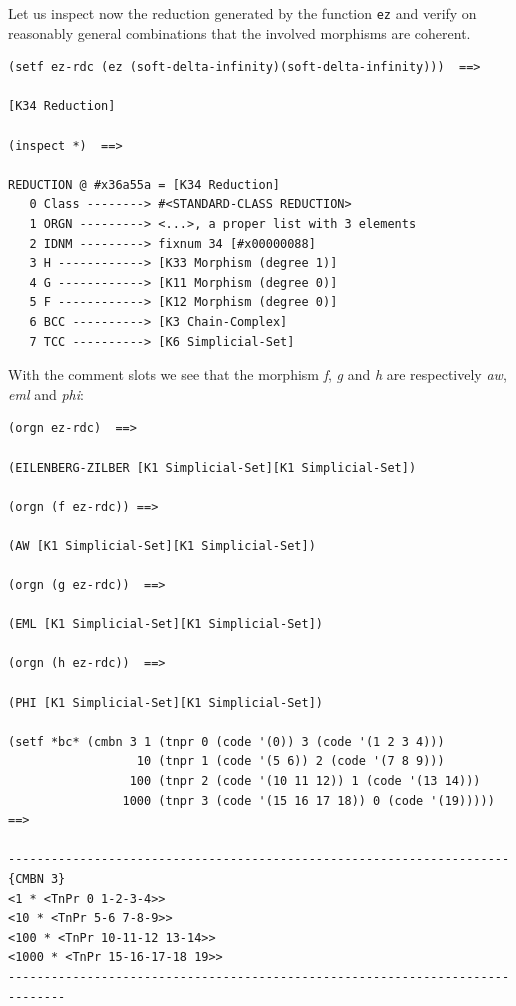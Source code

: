 Let us inspect now the reduction generated by the function {\tt ez} and 
verify on reasonably general combinations that the involved morphisms  are coherent.
{\footnotesize\begin{verbatim}
(setf ez-rdc (ez (soft-delta-infinity)(soft-delta-infinity)))  ==>

[K34 Reduction]

(inspect *)  ==>

REDUCTION @ #x36a55a = [K34 Reduction]
   0 Class --------> #<STANDARD-CLASS REDUCTION>
   1 ORGN ---------> <...>, a proper list with 3 elements
   2 IDNM ---------> fixnum 34 [#x00000088]
   3 H ------------> [K33 Morphism (degree 1)]
   4 G ------------> [K11 Morphism (degree 0)]
   5 F ------------> [K12 Morphism (degree 0)]
   6 BCC ----------> [K3 Chain-Complex]
   7 TCC ----------> [K6 Simplicial-Set]
\end{verbatim}}
With the comment slots we see that the morphism {\em f}, {\em g} and {\em h}
are respectively {\em aw}, {\em eml} and {\em phi}:
{\footnotesize\begin{verbatim}
(orgn ez-rdc)  ==>

(EILENBERG-ZILBER [K1 Simplicial-Set][K1 Simplicial-Set])

(orgn (f ez-rdc)) ==>

(AW [K1 Simplicial-Set][K1 Simplicial-Set])

(orgn (g ez-rdc))  ==>

(EML [K1 Simplicial-Set][K1 Simplicial-Set])

(orgn (h ez-rdc))  ==>

(PHI [K1 Simplicial-Set][K1 Simplicial-Set])

(setf *bc* (cmbn 3 1 (tnpr 0 (code '(0)) 3 (code '(1 2 3 4)))
                  10 (tnpr 1 (code '(5 6)) 2 (code '(7 8 9)))
                 100 (tnpr 2 (code '(10 11 12)) 1 (code '(13 14)))
                1000 (tnpr 3 (code '(15 16 17 18)) 0 (code '(19)))))  ==>

----------------------------------------------------------------------{CMBN 3}
<1 * <TnPr 0 1-2-3-4>>
<10 * <TnPr 5-6 7-8-9>>
<100 * <TnPr 10-11-12 13-14>>
<1000 * <TnPr 15-16-17-18 19>>
------------------------------------------------------------------------------
\end{verbatim}}
\newpage
